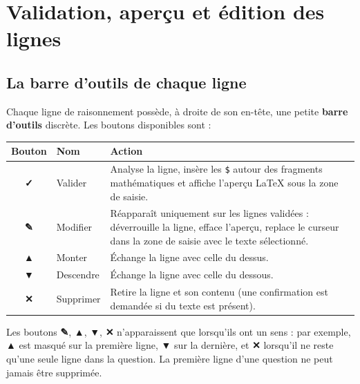 \documentclass[11pt,a4paper]{article}
\begin{document}
\section{Validation, aperçu et édition des lignes}
\label{sec:edition}

\subsection{La barre d'outils de chaque ligne}

Chaque ligne de raisonnement possède, à droite de son en-tête, une petite
\textbf{barre d'outils} discrète. Les boutons disponibles sont :

\begin{center}
\renewcommand{\arraystretch}{1.35}
\begin{tabular}{@{}c p{3.0cm} p{7.6cm}@{}}
\toprule
\textbf{Bouton} & \textbf{Nom} & \textbf{Action} \\
\midrule
\textbf{✓} & Valider & Analyse la ligne, insère les \texttt{\$} autour des
                     fragments mathématiques et affiche l'aperçu \LaTeX{} sous
                     la zone de saisie. \\
\addlinespace
\textbf{✎} & Modifier & Réapparaît uniquement sur les lignes validées :
                     déverrouille la ligne, efface l'aperçu, replace le curseur
                     dans la zone de saisie avec le texte sélectionné. \\
\addlinespace
\textbf{▲} & Monter & Échange la ligne avec celle du dessus. \\
\addlinespace
\textbf{▼} & Descendre & Échange la ligne avec celle du dessous. \\
\addlinespace
\textbf{✕} & Supprimer & Retire la ligne et son contenu (une confirmation est
                        demandée si du texte est présent). \\
\bottomrule
\end{tabular}
\end{center}

\begin{attention}
Les boutons \textbf{✎}, \textbf{▲}, \textbf{▼}, \textbf{✕} n'apparaissent que
lorsqu'ils ont un sens : par exemple, \textbf{▲} est masqué sur la première
ligne, \textbf{▼} sur la dernière, et \textbf{✕} lorsqu'il ne reste qu'une
seule ligne dans la question. La première ligne d'une question ne peut
jamais être supprimée.
\end{attention}
\end{document}

